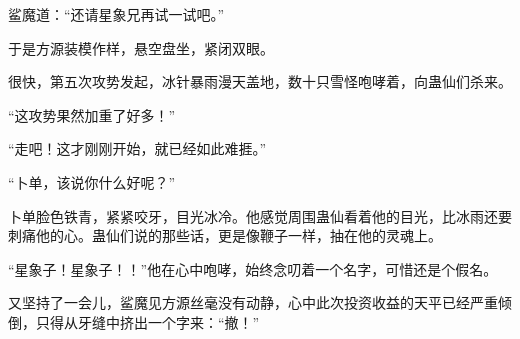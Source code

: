 \begin{this_body}
鲨魔道：“还请星象兄再试一试吧。”

于是方源装模作样，悬空盘坐，紧闭双眼。

很快，第五次攻势发起，冰针暴雨漫天盖地，数十只雪怪咆哮着，向蛊仙们杀来。

“这攻势果然加重了好多！”

“走吧！这才刚刚开始，就已经如此难捱。”

“卜单，该说你什么好呢？”

卜单脸色铁青，紧紧咬牙，目光冰冷。他感觉周围蛊仙看着他的目光，比冰雨还要刺痛他的心。蛊仙们说的那些话，更是像鞭子一样，抽在他的灵魂上。

“星象子！星象子！！”他在心中咆哮，始终念叨着一个名字，可惜还是个假名。

又坚持了一会儿，鲨魔见方源丝毫没有动静，心中此次投资收益的天平已经严重倾倒，只得从牙缝中挤出一个字来：“撤！”

\end{this_body}

